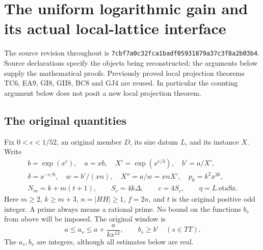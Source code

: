 \section{The uniform logarithmic gain and its actual local-lattice interface}
\label{sec:global-local-gain-v046}


The source revision throughout is
\texttt{7cbf7a0c32fca1badf05931879a37c3f8a2b03b4}.
Source declarations specify the objects being reconstructed; the
arguments below supply the mathematical proofs. Previously proved
local projection theorems TC6, EA9, GI8, GII8, BC8 and GJ4 are reused.
In particular the counting argument below does not posit a new local
projection theorem.

\subsection{The original quantities}

Fix \(0<\epsilon<1/52\), an original member \(D\), its size datum \(L\),
and its instance \(X\). Write
\[
 \begin{gathered}
 b=\exp(x^\epsilon),\quad a=xb,\quad
 X'=\exp(x^{\epsilon/3}),\quad b'=a/X',\\
 \delta=x^{-\epsilon/8},\quad
 w=b'/(xn),\quad X''=a/w=xnX',\quad
 p_0=k^2x^{26},\\
 N_m=k+m(t+1),\qquad S_c=4k\Delta,\qquad c=4S_c,
 \qquad \eta=L.\mathrm{etaSz}.
 \end{gathered}                                                    \tag{GLG.1}
\]
Here \(m\ge2\), \(k\ge m+3\), \(n=|HH|\ge1\), \(f=2n\),
and \(t\) is the original positive odd integer. A prime always means
a rational prime. No bound on the functions \(b_s\) from above will
be imposed. The original window is
\[
 a\le a_s\le a+\frac{a}{kx^{13}},\qquad b_s\ge b'
                         \quad(s\in TT).                         \tag{GLG.2}
\]
The \(a_s,b_s\) are integers, although all estimates below are real.

